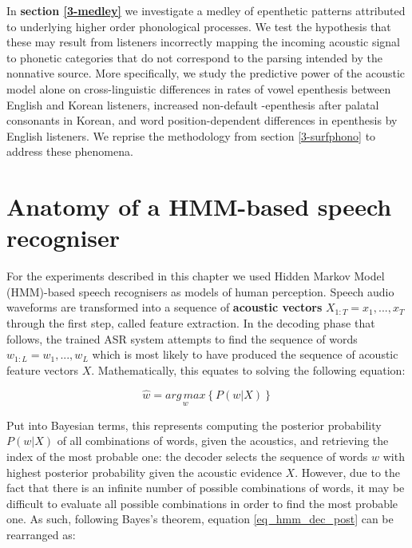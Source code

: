 In \textbf{section \ref{3-medley}} we investigate a medley of epenthetic patterns attributed to underlying higher order phonological processes. We test the hypothesis that these may result from listeners incorrectly mapping the incoming acoustic signal to phonetic categories that do not correspond to the parsing intended by the nonnative source. More specifically, we study the predictive power of the acoustic model alone on cross-linguistic differences in rates of vowel epenthesis between English and Korean listeners, increased non-default -epenthesis after palatal consonants in Korean, and word position-dependent differences in epenthesis by English listeners. We reprise the methodology from section \ref{3-surfphono} to address these phenomena.   


\newpage
\section{Anatomy of a HMM-based speech recogniser} \label{3-hmm}
For the experiments described in this chapter we used Hidden Markov Model (HMM)-based speech recognisers as models of human perception. 
Speech audio waveforms are transformed into a sequence of \textbf{acoustic vectors} $X_{1:T} = x_{1}, ..., x_{T}$ through the first step, called feature extraction. In the decoding phase that follows, the trained ASR system attempts to find the sequence of words $w_{1:L} = w_{1}, ..., w_{L}$ which is most likely to have produced the sequence of acoustic feature vectors $X$.
Mathematically, this equates to solving the following equation:

\begin{equation}
  \widehat{w} = \underset{w}{arg\,max} \left \{  P(w|X)\right \}
  \label{eq_hmm_dec_post}
\end{equation}

Put into Bayesian terms, this represents computing the posterior probability $P(w|X)$ of all combinations of words, given the acoustics, and retrieving the index of the most probable one: the decoder selects the sequence of words $w$ with highest posterior probability given the acoustic evidence $X$. However, due to the fact that there is an infinite number of possible combinations of words, it may be difficult to evaluate all possible combinations in order to find the most probable one. As such, following Bayes's theorem, equation \ref{eq_hmm_dec_post} can be rearranged as:

